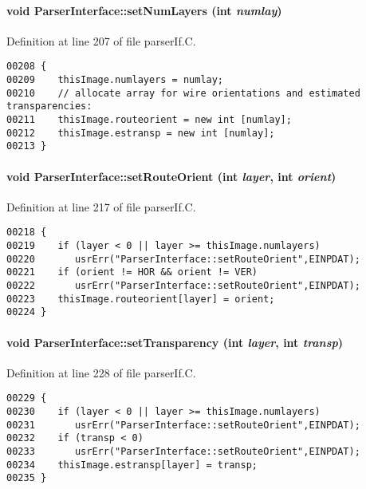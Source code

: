 \paragraph{\setlength{\rightskip}{0pt plus 5cm}void Parser\-Interface::set\-Num\-Layers (int {\em numlay})}\hfill



Definition at line 207 of file parser\-If.C.\small\begin{verbatim}00208 {
00209    thisImage.numlayers = numlay;
00210    // allocate array for wire orientations and estimated transparencies:
00211    thisImage.routeorient = new int [numlay];
00212    thisImage.estransp = new int [numlay];
00213 }
\end{verbatim}\normalsize 
\label{ParserInterface_a12}
\paragraph{\setlength{\rightskip}{0pt plus 5cm}void Parser\-Interface::set\-Route\-Orient (int {\em layer}, int {\em orient})}\hfill



Definition at line 217 of file parser\-If.C.\small\begin{verbatim}00218 {
00219    if (layer < 0 || layer >= thisImage.numlayers)
00220       usrErr("ParserInterface::setRouteOrient",EINPDAT);
00221    if (orient != HOR && orient != VER)
00222       usrErr("ParserInterface::setRouteOrient",EINPDAT);
00223    thisImage.routeorient[layer] = orient;
00224 }
\end{verbatim}\normalsize 
\label{ParserInterface_a13}
\paragraph{\setlength{\rightskip}{0pt plus 5cm}void Parser\-Interface::set\-Transparency (int {\em layer}, int {\em transp})}\hfill



Definition at line 228 of file parser\-If.C.\small\begin{verbatim}00229 {
00230    if (layer < 0 || layer >= thisImage.numlayers)
00231       usrErr("ParserInterface::setRouteOrient",EINPDAT);
00232    if (transp < 0)
00233       usrErr("ParserInterface::setRouteOrient",EINPDAT);
00234    thisImage.estransp[layer] = transp;
00235 }
\end{verbatim}\normalsize 


